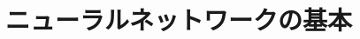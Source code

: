 \documentclass[../../topic_deep-learning]{subfiles}
\begin{document}
\chapter{ニューラルネットワークの基本}



\end{document}
